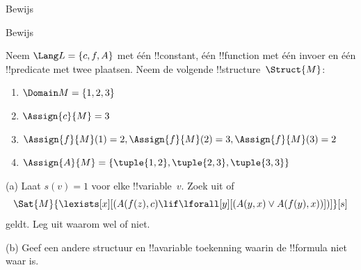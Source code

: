 \documentclass[openany]{memoir}
\begin{document}

\begin{prob}
  Bewijs 
\end{prob}
\tagendprob


\begin{prob}
  Bewijs 
\end{prob}
\tagendprob

\begin{prob}
Neem $\Lang L = \{c, f, A\}$ met één !!{constant}, één !!{function}
met één invoer en één !!{predicate} met twee plaatsen. Neem de volgende
!!{structure}~$\Struct{M}$:
\begin{enumerate}
\item $\Domain M = \{1, 2, 3\}$
\item $\Assign{c}{M} = 3$
\item $\Assign{f}{M}(1) = 2, \Assign{f}{M}(2) = 3, \Assign{f}{M}(3) = 2$
\item $\Assign{A}{M} = \{\tuple{1, 2}, \tuple{2, 3}, \tuple{3, 3}\}$
\end{enumerate}
(a) Laat $s(v) = 1$ voor elke !!{variable}~$v$. Zoek uit of
\[
\Sat{M}{\lexists[x][(A(f(z), c) \lif \lforall[y][(A(y, x) \lor A(f(y),
      x))])]}[s]
\]
geldt. Leg uit waarom wel of niet.

(b) Geef een andere structuur en !!a{variable} toekenning waarin de
!!{formula} niet waar is.
\end{prob}
\endgroup

\begingroup
\def\olfilename{OLP-0164}
\def\olfilepath{content/first-order-logic/syntax-and-semantics/}
\hypertarget{unit-OLP-0164}{}
\end{document}

